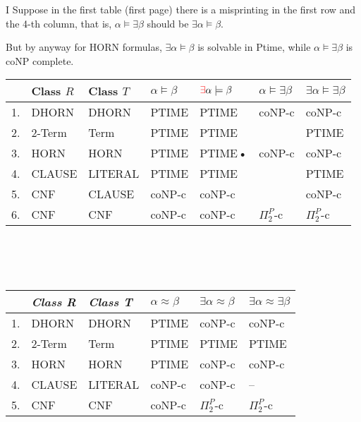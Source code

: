 \documentclass[12pt]{article}
\begin{document}
\color{red}
I Suppose in the first table (first page) there is a misprinting in the first row and the 4-th column, that is, $\alpha\models\exists \beta$ should be $\exists \alpha\models \beta$. 

But by anyway for HORN formulas, $\exists \alpha\models \beta$ is solvable in Ptime, while $\alpha\models\exists \beta$ is coNP complete.\\
\color{black}


\noindent\begin{tabular}{|l|l|l|l|l|l|l|}
\hline
 & Class $R$        & Class $T$      & $\alpha \models \beta$    & $\color{red}\exists\color{black}\alpha \models  \beta$ & \color{red}$\alpha\models \exists\beta$\color{black}  &$\exists \alpha \models \exists \beta$ \\ \hline
1. & DHORN          & DHORN          & PTIME           & \color{red} PTIME\color{black}   &  \color{red} coNP-c\color{black}           &  coNP-c    \\ \hline
2. & 2-Term         & Term           & PTIME           & PTIME  &             &  PTIME     \\ \hline
3. & HORN           & HORN           & PTIME           & \color{red} PTIME\color{black}\textbf{•}    &     \color{red} coNP-c\color{black}       &  coNP-c    \\ \hline
4. & CLAUSE         & LITERAL        & PTIME           & PTIME  &             &  PTIME     \\ \hline
5. & CNF            & CLAUSE         & coNP-c          & coNP-c  &            &  coNP-c    \\ \hline
6. & CNF            & CNF            & coNP-c            & \color{red} coNP-c\color{black}   &  \color{red} $\Pi_2^P$-c \color{black}         &  \color{red} $\Pi_2^P$-c \color{black}     \\ \hline
\end{tabular}


\ \ \\  \ \\ \


\begin{tabular}{|l|l|l|l|l|l|}
\hline
 & {\em Class R} &  {\em Class T} & $\alpha \approx \beta$ & $\exists \alpha \approx \beta$ & 
$\exists \alpha \approx \exists \beta$  \\ \hline
1. & DHORN   & DHORN   & PTIME  & \color{red} coNP-c\color{black}   & coNP-c   \\ \hline
2. & 2-Term  & Term    & PTIME  & PTIME  & PTIME    \\ \hline
3. & HORN    & HORN    & PTIME  & \color{red} coNP-c\color{black}   & coNP-c   \\ \hline
4. & CLAUSE  & LITERAL & coNP-c & coNP-c & --       \\ \hline
5. & CNF     & CNF     & coNP-c & \color{red} $\Pi_2^P$-c \color{black}   & \color{red} $\Pi_2^P$-c \color{black}     \\ \hline

\end{tabular}
\end{document}
